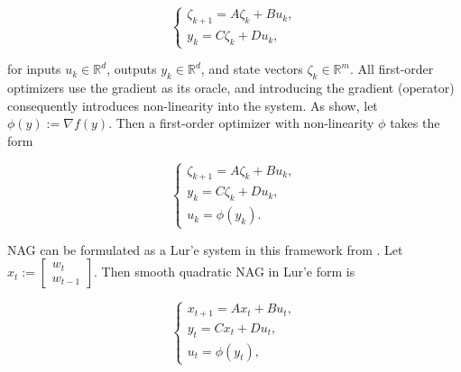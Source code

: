 \documentclass[twoside,11pt]{article}
\begin{document}
\begin{equation}
    \begin{cases}
        \zeta_{k+1} = A\zeta_k + Bu_k, \\
        y_k = C\zeta_k + Du_k,
    \end{cases}
\end{equation}

\noindent
for inputs $u_k \in \mathbb{R}^d$, outputs $y_k \in \mathbb{R}^d$, and state vectors $\zeta_k \in \mathbb{R}^m$. All first-order optimizers use the gradient as its oracle, and introducing the gradient (operator) consequently introduces non-linearity into the system. As \cite{LRP16} show, let $\phi(y) := \nabla f(y)$. Then a first-order optimizer with non-linearity $\phi$ takes the form

\begin{equation}
    \begin{cases}
        \zeta_{k+1} = A\zeta_k + Bu_k, \\
        y_k = C\zeta_k + Du_k, \\
        u_k = \phi(y_k).
    \end{cases}
\end{equation}

\noindent
NAG can be formulated as a Lur'e system in this framework from \cite{LRP16}. Let $x_t := \begin{bmatrix}
    w_t \\
    w_{t-1}
\end{bmatrix}$. Then smooth quadratic NAG in Lur'e form is

\begin{equation}
    \begin{cases}
        x_{t+1} = Ax_t + Bu_t, \\
        y_t = Cx_t + Du_t, \\
        u_t = \phi(y_t),
    \end{cases}
\end{equation}
\end{document}
